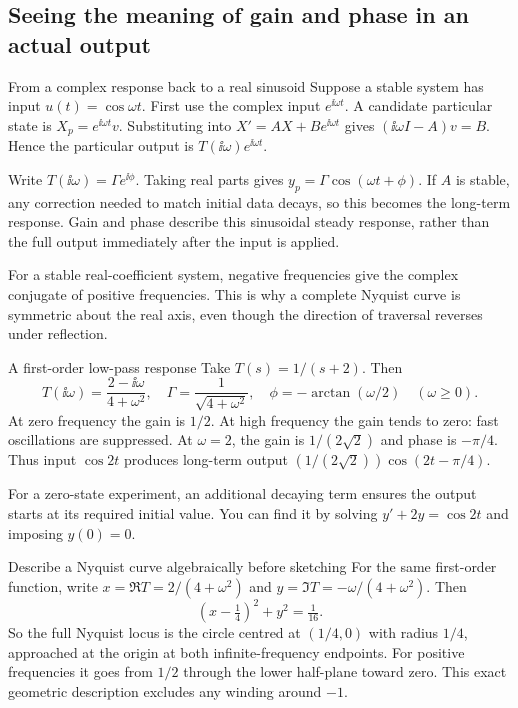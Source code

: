 \subsection{Seeing the meaning of gain and phase in an actual output}
\begin{concept}{From a complex response back to a real sinusoid}
Suppose a stable system has input $u(t)=\cos\omega t$. First use the complex input $e^{\ii\omega t}$. A candidate particular state is $X_p=e^{\ii\omega t}v$. Substituting into $X'=AX+Be^{\ii\omega t}$ gives $(\ii\omega I-A)v=B$. Hence the particular output is $T(\ii\omega)e^{\ii\omega t}$.

Write $T(\ii\omega)=\Gamma e^{\ii\phi}$. Taking real parts gives $y_p=\Gamma\cos(\omega t+\phi)$. If $A$ is stable, any correction needed to match initial data decays, so this becomes the long-term response. Gain and phase describe this sinusoidal steady response, rather than the full output immediately after the input is applied.

For a stable real-coefficient system, negative frequencies give the complex conjugate of positive frequencies. This is why a complete Nyquist curve is symmetric about the real axis, even though the direction of traversal reverses under reflection.
\end{concept}
\begin{worked}{A first-order low-pass response}
Take $T(s)=1/(s+2)$. Then
\[T(\ii\omega)=\frac{2-\ii\omega}{4+\omega^2},\quad\Gamma=\frac1{\sqrt{4+\omega^2}},\quad\phi=-\arctan(\omega/2)\quad(\omega\geq0).\]
At zero frequency the gain is $1/2$. At high frequency the gain tends to zero: fast oscillations are suppressed. At $\omega=2$, the gain is $1/(2\sqrt2)$ and phase is $-\pi/4$. Thus input $\cos2t$ produces long-term output $(1/(2\sqrt2))\cos(2t-\pi/4)$.

For a zero-state experiment, an additional decaying term ensures the output starts at its required initial value. You can find it by solving $y'+2y=\cos2t$ and imposing $y(0)=0$.
\end{worked}
\begin{method}{Describe a Nyquist curve algebraically before sketching}
For the same first-order function, write $x=\Re T=2/(4+\omega^2)$ and $y=\Im T=-\omega/(4+\omega^2)$. Then
\[(x-\tfrac14)^2+y^2=\tfrac1{16}.\]
So the full Nyquist locus is the circle centred at $(1/4,0)$ with radius $1/4$, approached at the origin at both infinite-frequency endpoints. For positive frequencies it goes from $1/2$ through the lower half-plane toward zero. This exact geometric description excludes any winding around $-1$.
\end{method}
